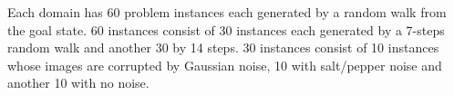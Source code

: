 Each domain has 60 problem instances each generated by a random walk from
the goal state. 60 instances consist of 30 instances each generated by a 7-steps random walk
and another 30 by 14 steps. 30 instances consist of 10 instances whose images are corrupted by Gaussian noise,
10 with salt/pepper noise and another 10 with no noise.

% 
% 
% 
% 

